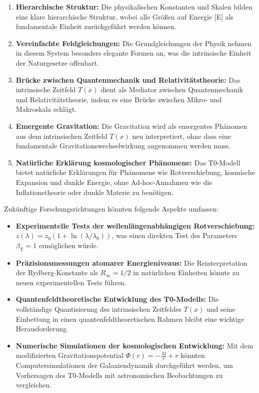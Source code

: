 \documentclass[12pt,a4paper]{article}
\newcommand{\Tfield}{T(x)}
\newcommand{\betaT}{\beta_{\text{T}}}
\begin{document}
\begin{enumerate}
	\item \textbf{Hierarchische Struktur:} Die physikalischen Konstanten und Skalen bilden eine klare hierarchische Struktur, wobei alle Größen auf Energie [E] als fundamentale Einheit zurückgeführt werden können.
	
	\item \textbf{Vereinfachte Feldgleichungen:} Die Grundgleichungen der Physik nehmen in diesem System besonders elegante Formen an, was die intrinsische Einheit der Naturgesetze offenbart.
	
	\item \textbf{Brücke zwischen Quantenmechanik und Relativitätstheorie:} Das intrinsische Zeitfeld $\Tfield$ dient als Mediator zwischen Quantenmechanik und Relativitätstheorie, indem es eine Brücke zwischen Mikro- und Makroskala schlägt.
	
	\item \textbf{Emergente Gravitation:} Die Gravitation wird als emergentes Phänomen aus dem intrinsischen Zeitfeld $\Tfield$ neu interpretiert, ohne dass eine fundamentale Gravitationswechselwirkung angenommen werden muss.
	
	\item \textbf{Natürliche Erklärung kosmologischer Phänomene:} Das T0-Modell bietet natürliche Erklärungen für Phänomene wie Rotverschiebung, kosmische Expansion und dunkle Energie, ohne Ad-hoc-Annahmen wie die Inflationstheorie oder dunkle Materie zu benötigen.
\end{enumerate}

Zukünftige Forschungsrichtungen könnten folgende Aspekte umfassen:

\begin{itemize}
	\item \textbf{Experimentelle Tests der wellenlängenabhängigen Rotverschiebung:} $z(\lambda) = z_0(1+\ln(\lambda/\lambda_0))$, was einen direkten Test des Parameters $\betaT = 1$ ermöglichen würde.
	
	\item \textbf{Präzisionsmessungen atomarer Energieniveaus:} Die Reinterpretation der Rydberg-Konstante als $R_\infty = 1/2$ in natürlichen Einheiten könnte zu neuen experimentellen Tests führen.
	
	\item \textbf{Quantenfeldtheoretische Entwicklung des T0-Modells:} Die vollständige Quantisierung des intrinsischen Zeitfeldes $\Tfield$ und seine Einbettung in einen quantenfeldtheoretischen Rahmen bleibt eine wichtige Herausforderung.
	
	\item \textbf{Numerische Simulationen der kosmologischen Entwicklung:} Mit dem modifizierten Gravitationspotential $\Phi(r) = -\frac{M}{r} + r$ könnten Computersimulationen der Galaxiendynamik durchgeführt werden, um Vorhersagen des T0-Modells mit astronomischen Beobachtungen zu vergleichen.
\end{itemize}
\end{document}
